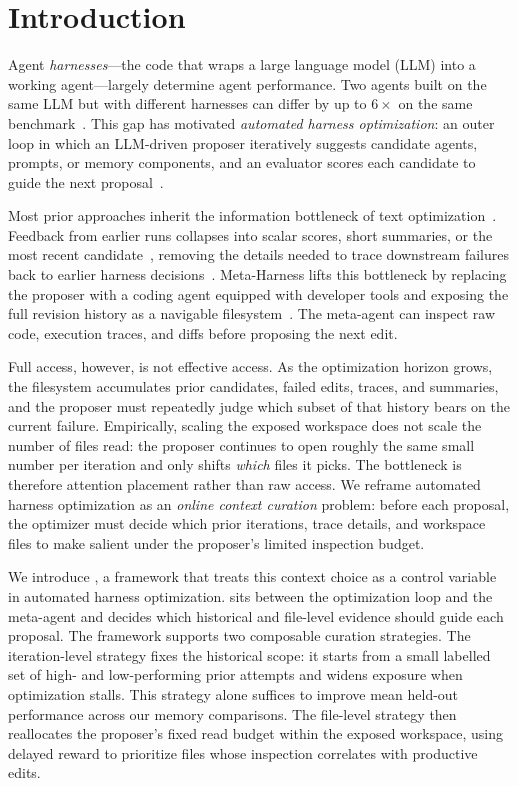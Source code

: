 \section{Introduction}
\label{sec:intro}

Agent \emph{harnesses}---the code that wraps a large language model
(LLM) into a working agent---largely determine agent performance. Two
agents built on the same LLM but with different harnesses can differ by
up to $6\times$ on the same benchmark~\cite{tian2026swe}. This gap has
motivated \emph{automated harness optimization}: an outer loop in which
an LLM-driven proposer iteratively suggests candidate agents, prompts,
or memory components, and an evaluator scores each candidate to guide
the next proposal~\cite{romeraparedes2024funsearch,novikov2025alphaevolve,sharma2025openevolve,agrawal2025gepa,lee2026metaharness}.

Most prior approaches inherit the information bottleneck of text
optimization~\cite{hu2024adas,sharma2025openevolve,zhang2025ace}.
Feedback from earlier runs collapses into scalar scores, short summaries,
or the most recent candidate~\cite{novikov2025alphaevolve,agrawal2025gepa,lee2025feedback,madaan2023self,yang2023large},
removing the details needed to trace downstream failures back to earlier
harness decisions~\cite{lee2026metaharness}. Meta-Harness lifts this
bottleneck by replacing the proposer with a coding agent equipped with
developer tools and exposing the full revision history as a navigable
filesystem~\cite{lee2026metaharness}. The meta-agent can inspect raw
code, execution traces, and diffs before proposing the next edit.

Full access, however, is not effective access. As the optimization
horizon grows, the filesystem accumulates prior candidates, failed
edits, traces, and summaries, and the proposer must repeatedly judge
which subset of that history bears on the current failure. Empirically,
scaling the exposed workspace does not scale the number of files read:
the proposer continues to open roughly the same small number per
iteration and only shifts \emph{which} files it picks. The bottleneck
is therefore attention placement rather than raw access. We reframe
automated harness optimization as an \emph{online context curation}
problem: before each proposal, the optimizer must decide which prior
iterations, trace details, and workspace files to make salient under
the proposer's limited inspection budget.

We introduce \textbf{\name}, a framework that treats this context
choice as a control variable in automated harness optimization. \name
sits between the optimization loop and the meta-agent and decides which
historical and file-level evidence should guide each proposal. The
framework supports two composable curation strategies. The
iteration-level strategy fixes the historical scope: it starts from a
small labelled set of high- and low-performing prior attempts and
widens exposure when optimization stalls. This strategy alone
suffices to improve mean held-out performance across our memory
comparisons. The file-level strategy then reallocates the proposer's
fixed read budget within the exposed workspace, using delayed reward
to prioritize files whose inspection correlates with productive edits.

